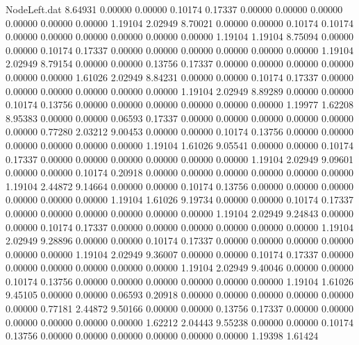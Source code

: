 \begin{filecontents}{NodeLeft.dat}
   8.64931    0.00000    0.00000     0.10174    0.17337    0.00000    0.00000    0.00000    0.00000    0.00000    0.00000    1.19104    2.02949
   8.70021    0.00000    0.00000     0.10174    0.10174    0.00000    0.00000    0.00000    0.00000    0.00000    0.00000    1.19104    1.19104
   8.75094    0.00000    0.00000     0.10174    0.17337    0.00000    0.00000    0.00000    0.00000    0.00000    0.00000    1.19104    2.02949
   8.79154    0.00000    0.00000     0.13756    0.17337    0.00000    0.00000    0.00000    0.00000    0.00000    0.00000    1.61026    2.02949
   8.84231    0.00000    0.00000     0.10174    0.17337    0.00000    0.00000    0.00000    0.00000    0.00000    0.00000    1.19104    2.02949
   8.89289    0.00000    0.00000     0.10174    0.13756    0.00000    0.00000    0.00000    0.00000    0.00000    0.00000    1.19977    1.62208
   8.95383    0.00000    0.00000     0.06593    0.17337    0.00000    0.00000    0.00000    0.00000    0.00000    0.00000    0.77280    2.03212
   9.00453    0.00000    0.00000     0.10174    0.13756    0.00000    0.00000    0.00000    0.00000    0.00000    0.00000    1.19104    1.61026
   9.05541    0.00000    0.00000     0.10174    0.17337    0.00000    0.00000    0.00000    0.00000    0.00000    0.00000    1.19104    2.02949
   9.09601    0.00000    0.00000     0.10174    0.20918    0.00000    0.00000    0.00000    0.00000    0.00000    0.00000    1.19104    2.44872
   9.14664    0.00000    0.00000     0.10174    0.13756    0.00000    0.00000    0.00000    0.00000    0.00000    0.00000    1.19104    1.61026
   9.19734    0.00000    0.00000     0.10174    0.17337    0.00000    0.00000    0.00000    0.00000    0.00000    0.00000    1.19104    2.02949
   9.24843    0.00000    0.00000     0.10174    0.17337    0.00000    0.00000    0.00000    0.00000    0.00000    0.00000    1.19104    2.02949
   9.28896    0.00000    0.00000     0.10174    0.17337    0.00000    0.00000    0.00000    0.00000    0.00000    0.00000    1.19104    2.02949
   9.36007    0.00000    0.00000     0.10174    0.17337    0.00000    0.00000    0.00000    0.00000    0.00000    0.00000    1.19104    2.02949
   9.40046    0.00000    0.00000     0.10174    0.13756    0.00000    0.00000    0.00000    0.00000    0.00000    0.00000    1.19104    1.61026
   9.45105    0.00000    0.00000     0.06593    0.20918    0.00000    0.00000    0.00000    0.00000    0.00000    0.00000    0.77181    2.44872
   9.50166    0.00000    0.00000     0.13756    0.17337    0.00000    0.00000    0.00000    0.00000    0.00000    0.00000    1.62212    2.04443
   9.55238    0.00000    0.00000     0.10174    0.13756    0.00000    0.00000    0.00000    0.00000    0.00000    0.00000    1.19398    1.61424

\end{filecontents}
